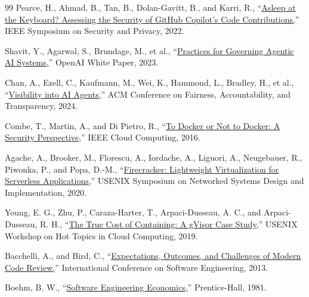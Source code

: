 \documentclass[12pt,a4paper,oneside]{report}
\begin{document}
\begin{thebibliography}{99}
 Pearce, H., Ahmad, B., Tan, B., Dolan-Gavitt, B., and Karri, R., ``\href{https://doi.org/10.1109/SP46214.2022.9833571}{Asleep at the Keyboard? Assessing the Security of GitHub Copilot's Code Contributions,}'' IEEE Symposium on Security and Privacy, 2022.

 Shavit, Y., Agarwal, S., Brundage, M., et al., ``\href{https://openai.com/index/practices-for-governing-agentic-ai-systems/}{Practices for Governing Agentic AI Systems,}'' OpenAI White Paper, 2023.

 Chan, A., Ezell, C., Kaufmann, M., Wei, K., Hammond, L., Bradley, H., et al., ``\href{https://doi.org/10.1145/3630106.3658948}{Visibility into AI Agents,}'' ACM Conference on Fairness, Accountability, and Transparency, 2024.

 Combe, T., Martin, A., and Di Pietro, R., ``\href{https://doi.org/10.1109/MCC.2016.100}{To Docker or Not to Docker: A Security Perspective,}'' IEEE Cloud Computing, 2016.

 Agache, A., Brooker, M., Florescu, A., Iordache, A., Liguori, A., Neugebauer, R., Piwonka, P., and Popa, D.-M., ``\href{https://www.usenix.org/conference/nsdi20/presentation/agache}{Firecracker: Lightweight Virtualization for Serverless Applications,}'' USENIX Symposium on Networked Systems Design and Implementation, 2020.

 Young, E. G., Zhu, P., Caraza-Harter, T., Arpaci-Dusseau, A. C., and Arpaci-Dusseau, R. H., ``\href{https://www.usenix.org/conference/hotcloud19/presentation/young}{The True Cost of Containing: A gVisor Case Study,}'' USENIX Workshop on Hot Topics in Cloud Computing, 2019.

 Bacchelli, A., and Bird, C., ``\href{https://doi.org/10.1109/ICSE.2013.6606617}{Expectations, Outcomes, and Challenges of Modern Code Review,}'' International Conference on Software Engineering, 2013.

 Boehm, B. W., ``\href{https://www.pearson.com/en-us/subject-catalog/p/software-engineering-economics/P200000000306}{Software Engineering Economics,}'' Prentice-Hall, 1981.
\end{thebibliography}
\endgroup
\end{document}

